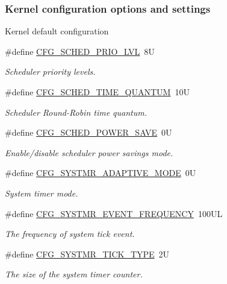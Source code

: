 \subsubsection*{Kernel configuration options and settings}
\label{_amgrpb927dce21981a007b6ce68c2f03fc275}%
Kernel default configuration \begin{DoxyCompactItemize}
\item 
\#define \hyperlink{group__template__kern__cfg_ga56bd89fe76f7fe22f3d8805bc3c68892}{C\-F\-G\-\_\-\-S\-C\-H\-E\-D\-\_\-\-P\-R\-I\-O\-\_\-\-L\-V\-L}~8\-U
\begin{DoxyCompactList}\small\item\em Scheduler priority levels. \end{DoxyCompactList}\item 
\#define \hyperlink{group__template__kern__cfg_ga0bd286f16bb67585f14c4d1e45be8ad1}{C\-F\-G\-\_\-\-S\-C\-H\-E\-D\-\_\-\-T\-I\-M\-E\-\_\-\-Q\-U\-A\-N\-T\-U\-M}~10\-U
\begin{DoxyCompactList}\small\item\em Scheduler Round-\/\-Robin time quantum. \end{DoxyCompactList}\item 
\#define \hyperlink{group__template__kern__cfg_ga4e6ab4994b34501bb71e75717b093376}{C\-F\-G\-\_\-\-S\-C\-H\-E\-D\-\_\-\-P\-O\-W\-E\-R\-\_\-\-S\-A\-V\-E}~0\-U
\begin{DoxyCompactList}\small\item\em Enable/disable scheduler power savings mode. \end{DoxyCompactList}\item 
\#define \hyperlink{group__template__kern__cfg_ga5f07eea2a4be92cf0358f52eba6800c9}{C\-F\-G\-\_\-\-S\-Y\-S\-T\-M\-R\-\_\-\-A\-D\-A\-P\-T\-I\-V\-E\-\_\-\-M\-O\-D\-E}~0\-U
\begin{DoxyCompactList}\small\item\em System timer mode. \end{DoxyCompactList}\item 
\#define \hyperlink{group__template__kern__cfg_ga4e46164ae5a37bfc54c67b6f01d93eb1}{C\-F\-G\-\_\-\-S\-Y\-S\-T\-M\-R\-\_\-\-E\-V\-E\-N\-T\-\_\-\-F\-R\-E\-Q\-U\-E\-N\-C\-Y}~100\-U\-L
\begin{DoxyCompactList}\small\item\em The frequency of system tick event. \end{DoxyCompactList}\item 
\#define \hyperlink{group__template__kern__cfg_gad69eef523459c5ab485ce2f62bddceca}{C\-F\-G\-\_\-\-S\-Y\-S\-T\-M\-R\-\_\-\-T\-I\-C\-K\-\_\-\-T\-Y\-P\-E}~2\-U
\begin{DoxyCompactList}\small\item\em The size of the system timer counter. \end{DoxyCompactList}\end{DoxyCompactItemize}
